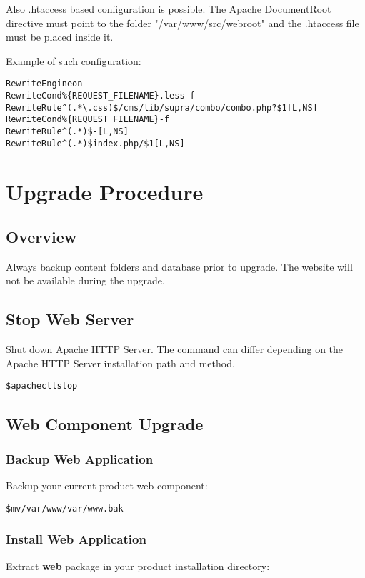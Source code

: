 \documentclass[12pt]{article}
\newcommand{\vigPathToProject}{/var/www}
\newcommand{\vigPathToSrc}{/src}
\newcommand{\vigPathToWebroot}{\vigPathToSrc/webroot}
\begin{document}
Also .htaccess based configuration is possible. The Apache DocumentRoot directive must point to the folder "\vigPathToProject\vigPathToWebroot" and the .htaccess file must be placed inside it.

Example of such configuration:

\begin{alltt}
RewriteEngine on
RewriteCond \%\{REQUEST_FILENAME\}.less -f
RewriteRule ^(.*\textbackslash.css)\$ /cms/lib/supra/combo/combo.php?\$1 [L,NS]
RewriteCond \%\{REQUEST_FILENAME\} -f
RewriteRule ^(.*)\$ - [L,NS]
RewriteRule ^(.*)\$ index.php/\$1 [L,NS]
\end{alltt}

\section{Upgrade Procedure}

\subsection{Overview}
Always backup content folders and database prior to upgrade. The website will not be available during the upgrade.

\subsection{Stop Web Server}
Shut down Apache HTTP Server. The command can differ depending on the Apache HTTP Server installation path and method.

\begin{alltt}
\$ apachectl stop
\end{alltt}

\subsection{Web Component Upgrade}

\subsubsection{Backup Web Application}
Backup your current product web component:

\begin{alltt}
\$ mv \vigPathToProject \vigPathToProject.bak
\end{alltt}

\subsubsection{Install Web Application}
Extract \textbf{web} package in your product installation directory:
\end{document}
